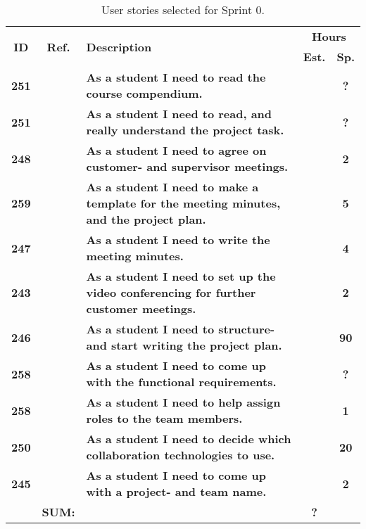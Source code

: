 \begin{table*}[!ht]
\caption{User stories selected for Sprint 0. }
\label{tab:sprint0stories}
\def\arraystretch{1.25}
\begin{tabularx}{\textwidth}{ccXcc} 
\toprule[1mm]

\multirow{2}{*}{\textbf{ID}} &
\multirow{2}{*}{\textbf{Ref.}} & \multirow{2}{*}{\textbf{Description}} & \multicolumn{2}{c}{\textbf{Hours}} \\
 					& & & \textbf{Est.} & \textbf{Sp.} \\

\midrule
\textbf{251} 	&
	& \textbf{As a student I need to read the course compendium.} 										& 			& \textbf{?} \\

\textbf{251} 	&
	& \textbf{As a student I need to read, and really understand the project task.} 						& 			& \textbf{?} \\	


\textbf{248} 	&
	& \textbf{As a student I need to agree on customer- and supervisor meetings.} 						& 			& \textbf{2} \\


\textbf{259} 	& 
	& {\bf As a student I need to make a template for the meeting minutes, and the project plan.} 		& 			& \textbf{5} \\


\textbf{247} 	&
	& \textbf{As a student I need to write the meeting minutes.} 										&  			& \textbf{4} \\

\textbf{243} 	&
	& \textbf{As a student I need to set up the video conferencing for further customer meetings.} 		& 			& \textbf{2} \\

\textbf{246} 	&
	& \textbf{As a student I need to structure- and start writing the project plan.} 					&  			& \textbf{90} \\

\textbf{258} 	&
	& \textbf{As a student I need to come up with the functional requirements.} 						&  			& \textbf{?} \\

\textbf{258} 	&
	& \textbf{As a student I need to help assign roles to the team members.} 							& 			& \textbf{1} \\

\textbf{250} 	&
	& \textbf{As a student I need to decide which collaboration technologies to use.} 					& 			& \textbf{20} \\
\textbf{245} 	& 
	& \textbf{As a student I need to come up with a project- and team name.} 							& 			& \textbf{2} \\
\midrule
				& \textbf{SUM:}		&			& \textbf{?}
 \\																			
\bottomrule[1mm]
\end{tabularx}
\end{table*}